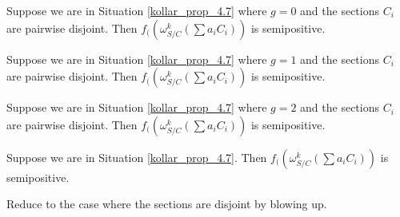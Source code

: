 \begin{lemma}
Suppose we are in Situation \ref{kollar_prop_4.7} where $g=0$ and the sections $C_i$ are pairwise disjoint.
Then $f_{(}(\omega_{S/C}^{k}(\sum a_iC_i))$ is semipositive.
\end{lemma}

\begin{lemma}
Suppose we are in Situation \ref{kollar_prop_4.7} where $g=1$ and the sections $C_i$ are pairwise disjoint.
Then $f_{(}(\omega_{S/C}^{k}(\sum a_iC_i))$ is semipositive.
\end{lemma}

\begin{lemma}
Suppose we are in Situation \ref{kollar_prop_4.7} where $g=2$ and the sections $C_i$ are pairwise disjoint.
Then $f_{(}(\omega_{S/C}^{k}(\sum a_iC_i))$ is semipositive.
\end{lemma}


\begin{lemma}
Suppose we are in Situation \ref{kollar_prop_4.7}.
Then $f_{(}(\omega_{S/C}^{k}(\sum a_iC_i))$ is semipositive.
\end{lemma}
\begin{lemma}
Reduce to the case where the sections are disjoint by blowing up.
\end{lemma}




